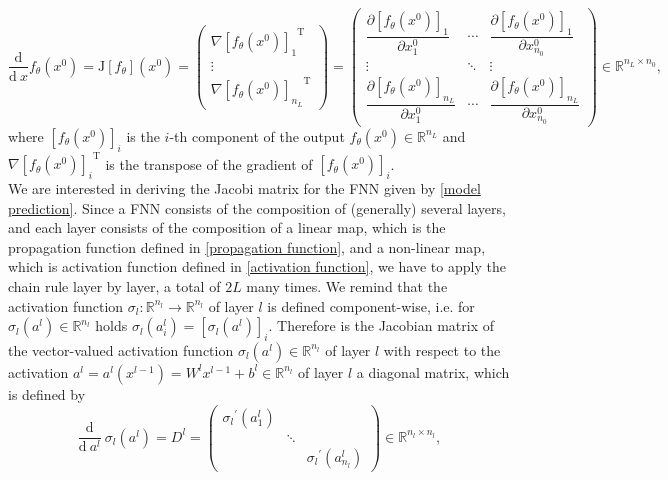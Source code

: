 \begin{equation*}
    \frac{\mathrm{d}}{\mathrm{d} \ x} f_{\theta}\left(x^0\right) = \mathrm{J} \left[f_{\theta} \right]\left(x^0\right) = \begin{pmatrix} \nabla {\left[f_{\theta}\left(x^0\right)\right]_{1}}^{\mathrm{T}} \\ \vdots \\  \nabla {\left[f_{\theta}\left(x^0\right)\right]_{n_L}}^{\mathrm{T}} \end{pmatrix} = \begin{pmatrix} \dfrac{\partial \left[f_{\theta}\left(x^0\right)\right]_1}{\partial x^0_{1}} & \cdots & \dfrac{\partial \left[f_{\theta}\left(x^0\right)\right]_1}{\partial x^0_{n_0}} \\ \vdots & \ddots & \vdots \\ \dfrac{\partial \left[f_{\theta}\left(x^0\right)\right]_{n_L}}{\partial x^0_{1}} & \cdots & \dfrac{\partial \left[f_{\theta}\left(x^0\right)\right]_{n_L}}{\partial x^0_{n_0}} \end{pmatrix} \in \mathbb{R}^{n_L \times n_0}, 
\end{equation*}
where $\left[f_{\theta}\left(x^0\right)\right]_i$ is the $i$-th component of the output $f_{\theta}\left(x^0\right) \in \mathbb{R}^{n_L}$ and $\nabla {\left[f_{\theta}\left(x^0\right)\right]_i}^{\mathrm{T}}$ is the transpose of the gradient of $\left[f_{\theta}\left(x^0\right)\right]_i$. \\
We are interested in deriving the Jacobi matrix for the FNN given by \cref{model prediction}. Since a FNN consists of the composition of (generally) several layers, and each layer consists of the composition of a linear map, which is the propagation function defined in \cref{propagation function}, and a non-linear map, which is activation function defined in \cref{activation function}, we have to apply the chain rule layer by layer, a total of $2L$ many times. We remind that the activation function $\sigma_{l} \colon \mathbb{R}^{n_l} \to \mathbb{R}^{n_l}$ of layer $l$ is defined component-wise, i.e. for $\sigma_{l}\left(a^l\right) \in \mathbb{R}^{n_l}$ holds $\sigma_{l}\left(a^l_i\right) = \left[ \sigma_{l}\left(a^l\right) \right]_i$. Therefore is the Jacobian matrix of the vector-valued activation function $\sigma_{l}\left(a^l\right) \in \mathbb{R}^{n_l}$ of layer $l$ with respect to the activation $a^l = a^l\left(x^{l-1}\right) = W^{l} x^{l-1} + b^{l} \in \mathbb{R}^{n_l}$ of layer $l$ a diagonal matrix, which is defined by
\begin{equation}
    \label{derivative:activation:function}
    \frac{\mathrm{d}}{\mathrm{d} \ a^{l}} \ \sigma_{l} \left(a^l\right) = D^{l} = \begin{pmatrix} {\sigma_{l}}^{\prime} \left( a^{l}_1 \right) & & \\ & \ddots & \\ & & {\sigma_{l}}^{\prime} \left( a^{l}_{n_l} \right) \end{pmatrix} \in \mathbb{R}^{n_l \times n_l}, 
\end{equation}
